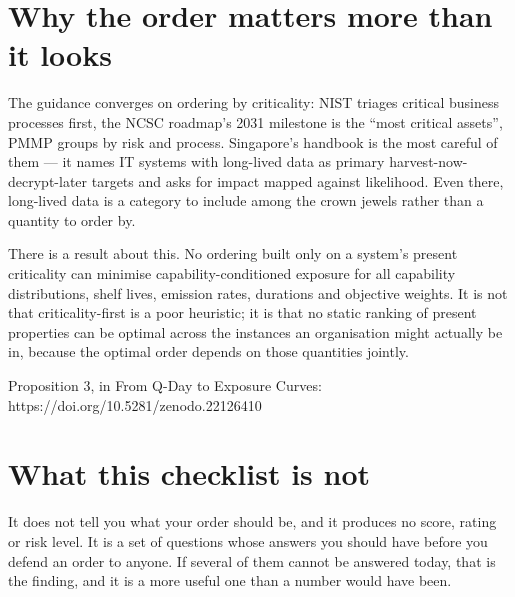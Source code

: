 \documentclass[10pt,a4paper]{article}
\begin{document}
\section*{Why the order matters more than it looks}
{\small The guidance converges on ordering by criticality: NIST triages critical business processes first, the NCSC roadmap's 2031 milestone is the ``most critical assets'', PMMP groups by risk and process. Singapore's handbook is the most careful of them --- it names IT systems with long-lived data as primary harvest-now-decrypt-later targets and asks for impact mapped against likelihood. Even there, long-lived data is a category to include among the crown jewels rather than a quantity to order by.\par}
{\small There is a result about this. No ordering built only on a system's present criticality can minimise capability-conditioned exposure for all capability distributions, shelf lives, emission rates, durations and objective weights. It is not that criticality-first is a poor heuristic; it is that no static ranking of present properties can be optimal across the instances an organisation might actually be in, because the optimal order depends on those quantities jointly.\par}
{\small Proposition 3, in From Q-Day to Exposure Curves: https://doi.org/10.5281/zenodo.22126410\par}
\section*{What this checklist is not}
{\small It does not tell you what your order should be, and it produces no score, rating or risk level. It is a set of questions whose answers you should have before you defend an order to anyone. If several of them cannot be answered today, that is the finding, and it is a more useful one than a number would have been.\par}
\end{document}

